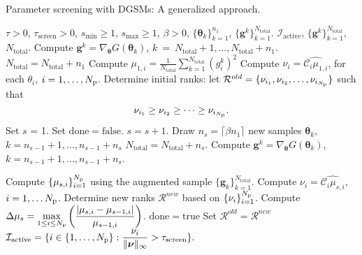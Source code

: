 \bigskip
\begin{breakablealgorithm}
\renewcommand{\algorithmicrequire}{\textbf{Input:}}
\renewcommand{\algorithmicensure}{\textbf{Output:}}
  \caption{Parameter screening with DGSMs: A generalized approach.}
  \begin{algorithmic}[1]
\Require $\tau > 0$, $\tau_\text{screen} > 0$, $s_\text{min} \geq 1$,
$s_\text{max} \geq 1$, $\beta > 0$, $\{ \bm{\theta}_k \}_{k = 1}^{n_1}$, $\{ \bm{g}^k \}_{k=1}^{N_\text{total}}$. 
\Ensure $\mathcal{I}_\text{active}$, $\{ \bm{g}^k \}_{k=1}^{N_\text{total}}$, $N_\text{total}$. 
      \State Compute $\bm{g}^k = \nabla_{\bm{\theta}}G(\bm\theta_k)$, 
             $k~=~N_\text{total}+1, \ldots, N_\text{total}+n_1$. 
      \State $N_\text{total} = N_\text{total} + n_1$
      \State Compute 
      $\mu_{1, i} = \frac{1}{N_\text{total}} \sum_{k = 1}^{N_\text{total}} (g^k_i)^2$
      \State Compute $\nu_i = \widehat{\mathcal{C}_i\mu_{1,i}}$, for each $\theta_i$, 
             $i = 1, \ldots, {N_\text{p}}$. 
      \State Determine initial ranks: 
            let $\mathcal{R}^{old} = \{ \nu_{i_1}, \nu_{i_2}, \ldots, \nu_{i_{N_\text{p}}}\}$ such that 
\[
   \nu_{i_1} \geq \nu_{i_2} \geq \cdots \geq \nu_{i_{N_\text{p}}}. 
\]
      \State Set $s$ = 1.
      \State Set $\mathrm{done} = \mathrm{false}$.
        \State $s = s + 1$.
        \State Draw $n_s = \lceil \beta n_1 \rceil$ new samples 
                  $\bm{\theta}_k$, $k = n_{s-1} + 1, \ldots, n_{s-1} + n_s$
       \State $N_\text{total} = N_\text{total} + n_s$.
        \State Compute $\bm{g}^k = \nabla_{\bm{\theta}}G(\bm\theta_k)$,
             $k = n_{s-1}+1, \ldots, n_{s-1}+n_s$.

        \State Compute $\{ \mu_{s,i} \}_{i=1}^{N_\text{p}}$ using the augmented sample 
               $\{\bm{g}_k \}_{k = 1}^{N_\text{total}}$.
        \State Compute $\nu_i = \widehat{\mathcal{C}_i\mu_{s,i}}$, $i = 1, \ldots {N_\text{p}}$.
        \State Determine new ranks $\mathcal{R}^{new}$ based on $\{\nu_i\}_{i=1}^{N_\text{p}}$. 
        \State Compute $\displaystyle\Delta\mu_s = \max_{1\leq i \leq {N_\text{p}}}
               \left(\frac{|\mu_{s,i} - \mu_{s-1,i}|}{ \mu_{s-1,i}}\right)$.
         \State $\mathrm{done} = \mathrm{true}$
      \Else
          \State Set $\mathcal{R}^{old} = \mathcal{R}^{new}$
      \EndIf
    \EndWhile
    \State $\mathcal{I}_\text{active} = \{ i \in \{1, \ldots, {N_\text{p}}\} : \displaystyle\frac{\nu_i}
        {\|\bm{\nu}\|_\infty} > \tau_\text{screen}\}.$
    
    \EndProcedure
  \end{algorithmic}
  \label{alg:screen}
\end{breakablealgorithm}
\bigskip

